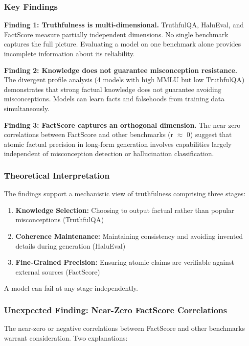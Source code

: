 
\subsubsection{Key Findings}

\textbf{Finding 1: Truthfulness is multi-dimensional.} TruthfulQA, HaluEval, and FactScore measure partially independent dimensions. No single benchmark captures the full picture. Evaluating a model on one benchmark alone provides incomplete information about its reliability.

\textbf{Finding 2: Knowledge does not guarantee misconception resistance.} The divergent profile analysis (4 models with high MMLU but low TruthfulQA) demonstrates that strong factual knowledge does not guarantee avoiding misconceptions. Models can learn facts and falsehoods from training data simultaneously.

\textbf{Finding 3: FactScore captures an orthogonal dimension.} The near-zero correlations between FactScore and other benchmarks (r $\approx$ 0) suggest that atomic factual precision in long-form generation involves capabilities largely independent of misconception detection or hallucination classification.

\subsubsection{Theoretical Interpretation}

The findings support a mechanistic view of truthfulness comprising three stages:

\begin{enumerate}
\item \textbf{Knowledge Selection:} Choosing to output factual rather than popular misconceptions (TruthfulQA)
\item \textbf{Coherence Maintenance:} Maintaining consistency and avoiding invented details during generation (HaluEval)
\item \textbf{Fine-Grained Precision:} Ensuring atomic claims are verifiable against external sources (FactScore)
\end{enumerate}

A model can fail at any stage independently.

\subsubsection{Unexpected Finding: Near-Zero FactScore Correlations}

The near-zero or negative correlations between FactScore and other benchmarks warrant consideration. Two explanations:

